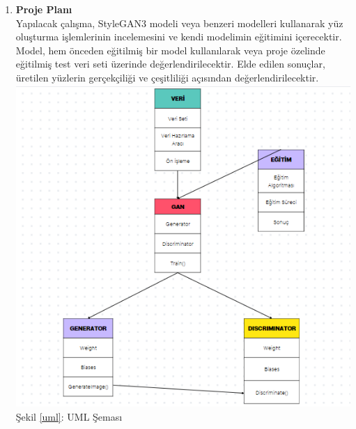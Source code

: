 \documentclass[12pt, a4paper]{article}
\begin{document}
	\begin{enumerate}
		\item \textbf{Proje Planı}
		\\Yapılacak çalışma, StyleGAN3 modeli veya benzeri modelleri kullanarak yüz oluşturma işlemlerinin incelemesini ve kendi modelimin eğitimini içerecektir. Model, hem önceden eğitilmiş bir model kullanılarak veya proje özelinde eğitilmiş test veri seti üzerinde değerlendirilecektir. Elde edilen sonuçlar, üretilen yüzlerin gerçekçiliği ve çeşitliliği açısından değerlendirilecektir.
		\includegraphics[width=1\textwidth]{uml}
		\label{uml}
		Şekil \ref{uml}: UML Şeması
		

\end{enumerate}
\end{document}
